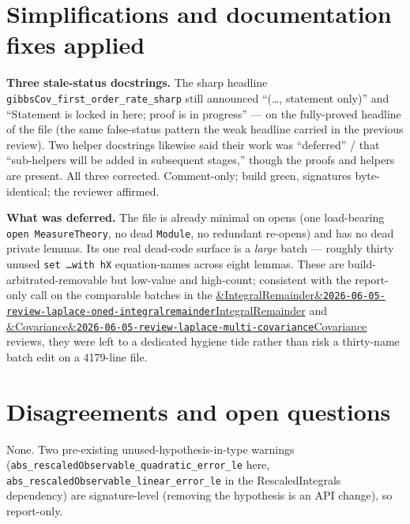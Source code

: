 \documentclass[11pt]{article}
\newcommand{\reviewref}[2][]{\href{https://therisensea.org/reviews/#2/}{\ifx&#1&\texttt{#2}\else#1\fi}}
\begin{document}
\section{Simplifications and documentation fixes applied}
\textbf{Three stale-status docstrings.} The sharp headline
\texttt{gibbsCov\_first\_order\_rate\_sharp} still announced ``(\dots, statement only)'' and
``Statement is locked in here; proof is in progress'' --- on the fully-proved headline of the file (the
same false-status pattern the weak headline carried in the previous review). Two helper docstrings
likewise said their work was ``deferred'' / that ``sub-helpers will be added in subsequent stages,''
though the proofs and helpers are present. All three corrected. Comment-only; build green, signatures
byte-identical; the reviewer affirmed.

\textbf{What was deferred.} The file is already minimal on opens (one load-bearing
\texttt{open MeasureTheory}, no dead \texttt{Module}, no redundant re-opens) and has no dead private
lemmas. Its one real dead-code surface is a \emph{large} batch --- roughly thirty unused
\texttt{set \dots with hX} equation-names across eight lemmas. These are build-arbitrated-removable but
low-value and high-count; consistent with the report-only call on the comparable batches in the
\reviewref[IntegralRemainder]{2026-06-05-review-laplace-oned-integralremainder} and
\reviewref[Covariance]{2026-06-05-review-laplace-multi-covariance} reviews, they were left to a
dedicated hygiene tide rather than risk a thirty-name batch edit on a 4179-line file.

\section{Disagreements and open questions}
None. Two pre-existing unused-hypothesis-in-type warnings
(\texttt{abs\_rescaledObservable\_quadratic\_error\_le} here,
\texttt{abs\_rescaledObservable\_linear\_error\_le} in the RescaledIntegrals dependency) are
signature-level (removing the hypothesis is an API change), so report-only.
\end{document}
